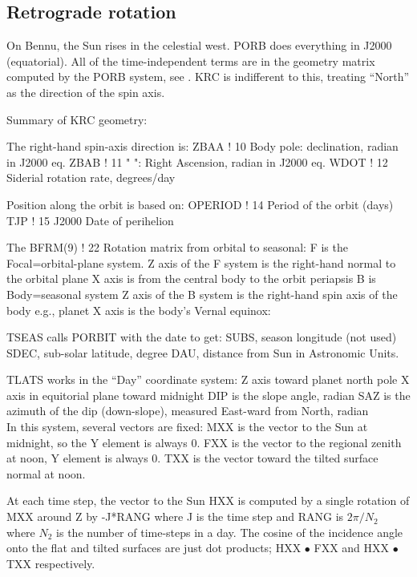 \documentclass{article}
\begin{document}

\subsection{Retrograde rotation}  %
On Bennu, the Sun rises in the celestial west. PORB does everything in J2000 (equatorial).  All of the time-independent terms are in the geometry matrix computed by the PORB system, see  . 
KRC is indifferent to this, treating ``North'' as the direction of the spin axis.

Summary of KRC geometry:

The right-hand spin-axis direction is: 
\qi ZBAA ! 10 Body pole: declination, radian in J2000 eq.
\qi ZBAB ! 11 " ": Right Ascension, radian in J2000 eq.
\qi WDOT ! 12 Siderial rotation rate, degrees/day

Position along the orbit is based on:
\qi OPERIOD ! 14 Period of the orbit (days)
\qi TJP ! 15 J2000 Date of perihelion

The BFRM(9) ! 22 Rotation matrix from orbital to seasonal:
\qi F is the Focal=orbital-plane system.
\qii Z axis of the F system is the right-hand normal to the orbital plane
\qii X axis is from the central body to the orbit periapsis
\qi B is Body=seasonal system
\qii Z axis of the B system is the right-hand spin axis of the body e.g., planet
\qii X axis is the body’s Vernal equinox: 

TSEAS calls PORBIT with the date to get:
\qi SUBS, season longitude (not used)
\qi SDEC, sub-solar latitude, degree
\qi DAU, distance from Sun in Astronomic Units. 

TLATS works in the ``Day'' coordinate system: 
\qii Z axis toward planet north pole
\qii X axis in equitorial plane toward midnight 
\qi DIP is the slope angle, radian
\qi SAZ is the azimuth of the dip (down-slope), measured East-ward from North, radian
\\ In this system, several vectors are fixed:
\qi MXX is the vector to the Sun at midnight, so the Y element is always 0.
\qi FXX is the vector to the regional zenith at noon,  Y element is always 0.
\qi TXX is the vector toward the tilted surface normal at noon.

At each time step, the vector to the Sun HXX is computed by a single rotation of
MXX around Z by -J*RANG where J is the time step and RANG is $2 \pi / N_2$ where
$N_2$ is the number of time-steps in a day. The cosine of the incidence angle
onto the flat and tilted surfaces are just dot products; HXX $\bullet$ FXX and 
 HXX $\bullet$ TXX respectively. 
\end{document}
